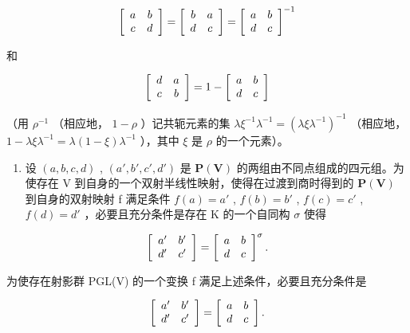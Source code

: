 \[
\left[ \begin{array}{c c} a & b \\ c & d \end{array} \right] = \left[ \begin{array}{c c} b & a \\ d & c \end{array} \right] = \left[ \begin{array}{c c} a & b \\ d & c \end{array} \right] ^ {- 1}
\]

和

\[
\left[ \begin{array}{c c} d & a \\ c & b \end{array} \right] = 1 - \left[ \begin{array}{c c} a & b \\ d & c \end{array} \right]
\]

（用 \(\rho^{-1}\) （相应地， \(1 - \rho\) ）记共轭元素的集 \(\lambda \xi^{-1} \lambda^{-1} = (\lambda \xi \lambda^{-1})^{-1}\) （相应地， \(1 - \lambda \xi \lambda^{-1} = \lambda (1 - \xi) \lambda^{-1}\) ），其中 \(\xi\) 是 \(\rho\) 的一个元素）。

\begin{enumerate}
\def\labelenumi{(\alph{enumi})}
\setcounter{enumi}{2}
\tightlist
\item
  设 \((a, b, c, d)\) , \((a', b', c', d')\) 是 \(\mathbf{P}(\mathbf{V})\) 的两组由不同点组成的四元组。为使存在 V 到自身的一个双射半线性映射，使得在过渡到商时得到的 \(\mathbf{P}(\mathbf{V})\) 到自身的双射映射 f 满足条件 \(f(a) = a'\) , \(f(b) = b'\) , \(f(c) = c'\) , \(f(d) = d'\) ，必要且充分条件是存在 K 的一个自同构 \(\sigma\) 使得
\end{enumerate}

\[
\left[ \begin{array}{c c} a ^ {\prime} & b ^ {\prime} \\ d ^ {\prime} & c ^ {\prime} \end{array} \right] = \left[ \begin{array}{c c} a & b \\ d & c \end{array} \right] ^ {\sigma}.
\]

为使存在射影群 PGL(V) 的一个变换 f 满足上述条件，必要且充分条件是

\[
\left[ \begin{array}{c c} a ^ {\prime} & b ^ {\prime} \\ d ^ {\prime} & c ^ {\prime} \end{array} \right] = \left[ \begin{array}{c c} a & b \\ d & c \end{array} \right].
\]

